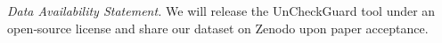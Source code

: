 \noindent \textit{Data Availability Statement.}
We will release the UnCheckGuard tool under an open‐source license and share our dataset on Zenodo upon paper acceptance.




